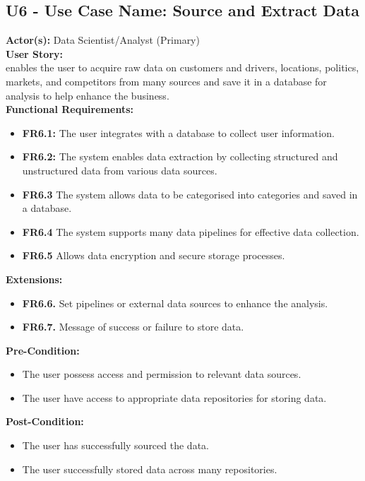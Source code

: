 \documentclass[9pt]{report}
\begin{document}
\subsection*{U6 - Use Case Name:  Source and Extract Data}
\textbf{Actor(s):} Data Scientist/Analyst (Primary)
\textbf{\\User Story:}\\enables the user to acquire raw data on customers and drivers, locations, politics, markets, and competitors from many sources and save it in a database for analysis to help enhance the business.
\textbf{\\Functional Requirements:}
\begin{itemize}
    \item \textbf{FR6.1:} The user integrates with a database to collect user information.
    \item \textbf{FR6.2:} The system enables data extraction by collecting structured and unstructured data from various data sources.
    \item \textbf{FR6.3} The system allows data to be categorised into categories and saved in a database.
    \item \textbf{FR6.4} The system supports many data pipelines for effective data collection.
    \item \textbf{FR6.5} Allows data encryption and secure storage processes.
\end{itemize}
\textbf{Extensions:}
\begin{itemize}
    \item \textbf{FR6.6.} Set pipelines or external data sources to enhance the analysis.
    \item \textbf{FR6.7.} Message of success or failure to store data.
\end{itemize}
\textbf{Pre-Condition:}
\begin{itemize}
    \item The user possess access and permission to relevant data sources.
    \item The user have access to appropriate data repositories for storing data.
\end{itemize}
\textbf{Post-Condition:} 
\begin{itemize}
    \item The user has successfully sourced the data.
    \item The user successfully stored data across many repositories.
\end{itemize}
\end{document}
